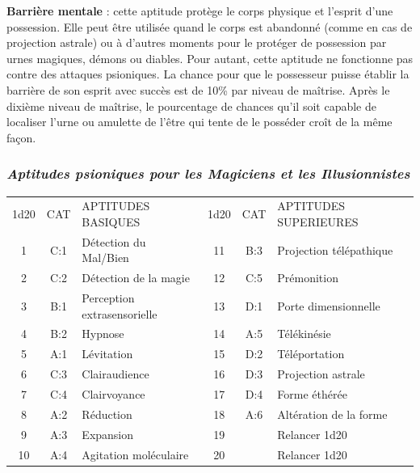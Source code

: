 \documentclass[11pt]{article}
\begin{document}
{\bigskip

\textbf{Barrière mentale} : cette aptitude protège le corps physique et l'esprit d'une possession. Elle peut être utilisée quand le corps est abandonné (comme en cas de projection astrale) ou à d'autres moments pour le protéger de possession par urnes magiques, démons ou diables. Pour autant, cette aptitude ne fonctionne pas contre des attaques psioniques. La chance pour que le possesseur puisse établir la barrière de son esprit avec succès est de 10\% par niveau de maîtrise. Après le dixième niveau de maîtrise, le pourcentage de chances qu'il soit capable de localiser l'urne ou amulette de l'être qui tente de le posséder croît de la même façon.









\newpage
\subsubsection*{\textit{Aptitudes psioniques pour les Magiciens et les Illusionnistes}}

\begin{tabular}{cclccl}
1d20& CAT & APTITUDES BASIQUES &  1d20            & CAT & APTITUDES SUPERIEURES \\
1   & C:1 & Détection du Mal/Bien & 11            & B:3 & Projection télépathique  \\
2   & C:2 & Détection de la magie & 12            & C:5 & Prémonition \\
3   & B:1 & Perception extrasensorielle  & 13     & D:1 & Porte dimensionnelle  \\
4   & B:2 & Hypnose  & 14                         & A:5 & Télékinésie  \\
5   & A:1 & Lévitation  & 15                      & D:2 & Téléportation  \\
6   & C:3 & Clairaudience  & 16                   & D:3 & Projection astrale \\
7   & C:4 & Clairvoyance  & 17                    & D:4 & Forme éthérée  \\
8   & A:2 & Réduction  & 18                       & A:6 & Altération de la forme  \\
9   & A:3 & Expansion & 19                        && Relancer 1d20 \\
10  & A:4 & Agitation moléculaire  & 20           && Relancer 1d20\\
\end{tabular}

}
\end{document}
